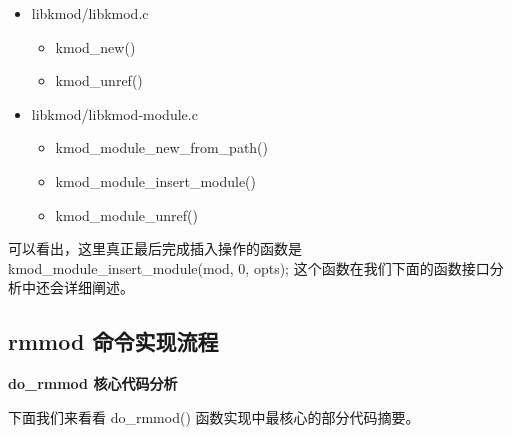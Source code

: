 \begin{itemize}
\item
  libkmod/libkmod.c
  \begin{itemize}
  \item
    kmod\_new()
  \item
    kmod\_unref()
  \end{itemize}
\item
  libkmod/libkmod-module.c
  \begin{itemize}
  \item
    kmod\_module\_new\_from\_path()
  \item
    kmod\_module\_insert\_module()
  \item
    kmod\_module\_unref()
  \end{itemize}
\end{itemize}
可以看出，这里真正最后完成插入操作的函数是
kmod\_module\_insert\_module(mod, 0, opts);
这个函数在我们下面的函数接口分析中还会详细阐述。

\subsection{rmmod 命令实现流程}

\textbf{do\_rmmod 核心代码分析}

下面我们来看看 do\_rmmod() 函数实现中最核心的部分代码摘要。

